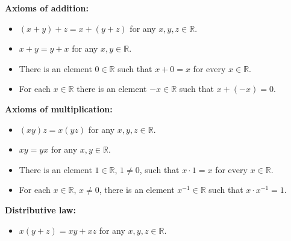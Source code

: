 \textbf{Axioms of addition:}
\begin{itemize}
\item[A1.] $(x + y) + z = x + (y + z)$ for any $x, y, z \in \mathbb{R}$.
\item[A2.] $x + y = y + x$ for any $x, y \in \mathbb{R}$.
\item[A3.] There is an element $0 \in \mathbb{R}$ such that $x + 0 = x$ for every $x \in \mathbb{R}$.
\item[A4.] For each $x \in \mathbb{R}$ there is an element $-x \in \mathbb{R}$ such that $x + (-x) = 0$.
\end{itemize}

\textbf{Axioms of multiplication:}
\begin{itemize}
\item[M1.] $(xy)z = x(yz)$ for any $x, y, z \in \mathbb{R}$.
\item[M2.] $xy = yx$ for any $x, y \in \mathbb{R}$.
\item[M3.] There is an element $1 \in \mathbb{R}$, $1 \neq 0$, such that $x \cdot 1 = x$ for every $x \in \mathbb{R}$.
\item[M4.] For each $x \in \mathbb{R}$, $x \neq 0$, there is an element $x^{-1} \in \mathbb{R}$ such that $x \cdot x^{-1} = 1$.
\end{itemize}

\textbf{Distributive law:}
\begin{itemize}
\item[DL.] $x(y + z) = xy + xz$ for any $x, y, z \in \mathbb{R}$.
\end{itemize}

